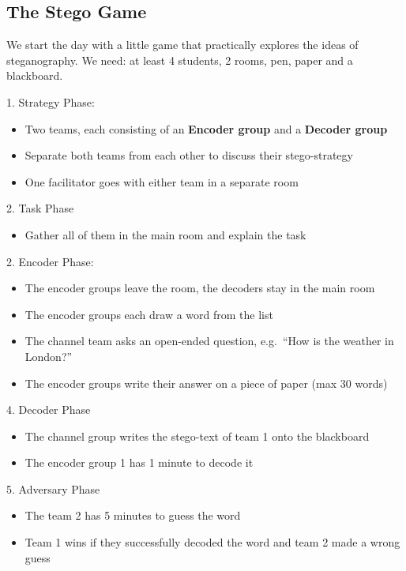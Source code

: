 \documentclass[11pt]{article}
\begin{document}
\subsection{The Stego Game}
\label{sec:stego-game}

We start the day with a little game that practically explores the ideas of
steganography.
We need: at least 4 students, 2 rooms, pen, paper and a blackboard.

1. Strategy Phase:

\begin{itemize}
  \item Two teams, each consisting of an \textbf{Encoder group} and a
        \textbf{Decoder group}
  \item Separate both teams from each other to discuss their stego-strategy
  \item One facilitator goes with either team in a separate room
\end{itemize}

2. Task Phase

\begin{itemize}
  \item Gather all of them in the main room and explain the task
\end{itemize}

2. Encoder Phase:

\begin{itemize}
  \item The encoder groups leave the room, the decoders stay in the main room
  \item The encoder groups each draw a word from the list
  \item The channel team asks an open-ended question, e.g.\ ``How is the
        weather in London?''
  \item The encoder groups write their answer on a piece of paper (max 30 words)
\end{itemize}

4. Decoder Phase

\begin{itemize}
  \item The channel group writes the stego-text of team 1 onto the blackboard
  \item The encoder group 1 has 1 minute to decode it
\end{itemize}

5. Adversary Phase

\begin{itemize}
  \item The team 2 has 5 minutes to guess the word
  \item Team 1 wins if they successfully decoded the word and team 2 made a
        wrong guess
\end{itemize}
\end{document}
